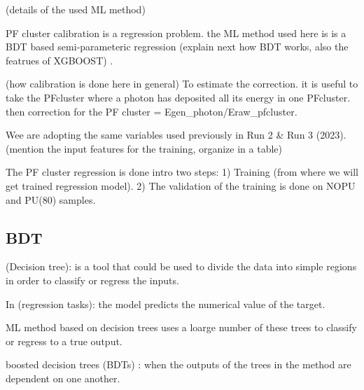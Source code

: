 (details of the used ML method)


PF cluster calibration is a regression problem. the ML method used here is is a BDT based semi-parameteric regression
(explain next how BDT works, also the featrues of  XGBOOST) .

(how calibration is done here in general)
To estimate the correction. it is useful to take the PFcluster where a photon has deposited all its energy in one PFcluster.
then correction for the PF cluster = Egen_photon/Eraw_pfcluster.




Wee are adopting the same variables used previously in Run 2 & Run 3 (2023).
(mention the input features for the training, organize in a table) 

The PF cluster regression is done intro two steps:
1) Training (from where we will get trained regression model).
2) The validation of the training is done on NOPU and PU(80) samples.


\subsection{BDT}

(Decision tree): is a tool that could be used to divide the data into simple regions in order to classify or regress the inputs.

In (regression tasks): the model predicts the numerical value of the target.

ML method based on decision trees uses a loarge number of these trees to classify or regress to a true output.

boosted decision trees (BDTs) : when the outputs of the trees in the method are dependent on one another.

